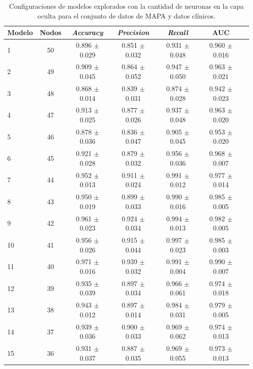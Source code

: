 \begin{table}[H]
	\centering
	\caption[Configuraciones de modelos explorados para el conjunto de datos de MAPA y datos clínicos.]{Configuraciones de modelos explorados con la cantidad de neuronas en la capa oculta para el conjunto de datos de MAPA y datos clínicos.}
	\begin{tabular}{l c c c c c c}    
		\toprule
		\textbf{Modelo} & \textbf{Nodos} & \textbf{\emph{Accuracy}} & \textbf{\emph{Precision}} & \textbf{\emph{Recall}}  & \textbf{AUC}\\
		\midrule
    
      1 & 50 & 0.896 $\pm$ 0.029 & 0.851 $\pm$ 0.032	& 0.931 $\pm$ 0.048 & 0.960  $\pm$ 0.016\\
      2 & 49 & 0.909 $\pm$ 0.045 & 0.864 $\pm$ 0.052	& 0.947 $\pm$ 0.050 & 0.963  $\pm$ 0.021\\
      3 & 48 & 0.868 $\pm$ 0.014 & 0.839 $\pm$ 0.031	& 0.874 $\pm$ 0.028 & 0.942  $\pm$ 0.023\\
      4 & 47 & 0.913 $\pm$ 0.025 & 0.877 $\pm$ 0.026	& 0.937 $\pm$ 0.048 & 0.963  $\pm$ 0.020\\
      5 & 46 & 0.878 $\pm$ 0.036 & 0.836 $\pm$ 0.047	& 0.905 $\pm$ 0.045 & 0.953  $\pm$ 0.020\\
      6 & 45 & 0.921 $\pm$ 0.028 & 0.879 $\pm$ 0.032	& 0.956 $\pm$ 0.036 & 0.968  $\pm$ 0.007\\
      7 & 44 & 0.952 $\pm$ 0.013 & 0.911 $\pm$ 0.024	& 0.991 $\pm$ 0.012 & 0.977  $\pm$ 0.014\\      
      8 & 43 & 0.950 $\pm$ 0.019 & 0.899 $\pm$ 0.033	& 0.990 $\pm$ 0.016 & 0.985  $\pm$ 0.005\\
      9 & 42 & 0.961 $\pm$ 0.023 & 0.924 $\pm$ 0.034	& 0.994 $\pm$ 0.013 & 0.982  $\pm$ 0.005\\
      10 & 41 & 0.956 $\pm$ 0.026 & 0.915 $\pm$ 0.044	& 0.997 $\pm$ 0.023 & 0.985  $\pm$ 0.003\\
      11 & 40 & 0.971 $\pm$ 0.016 & 0.939 $\pm$ 0.032	& 0.991 $\pm$ 0.004 & 0.990  $\pm$ 0.007\\
      12 & 39 & 0.935 $\pm$ 0.039 & 0.897 $\pm$ 0.034	& 0.966 $\pm$ 0.061 & 0.974  $\pm$ 0.018\\
      13 & 38 & 0.943 $\pm$ 0.012 & 0.897 $\pm$ 0.014	& 0.984 $\pm$ 0.031 & 0.979  $\pm$ 0.005\\
      14 & 37 & 0.939 $\pm$ 0.036 & 0.900 $\pm$ 0.033	& 0.969 $\pm$ 0.062 & 0.974  $\pm$ 0.013\\
      15 & 36 & 0.931 $\pm$ 0.037 & 0.887 $\pm$ 0.035	& 0.969 $\pm$ 0.055 & 0.973  $\pm$ 0.013\\

\end{tabular}
\end{table}
